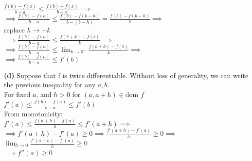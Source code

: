 \documentclass{article}
\begin{document}
\noindent $\frac{f(b) - f(a)}{b - a} \leq \frac{f(b) - f(x)}{b - x} \implies$ \\

\noindent $\implies \frac{f(b) - f(a)}{b - a} \leq \frac{f(b) - f(b - h)}{b - (b - h)} = \frac{f(b) - f(b - h)}{h} \implies$ \\
\noindent replace $h \to -k$ \\

\noindent $\implies \frac{f(b) - f(a)}{b - a} \leq \frac{f(b + k) - f(b)}{k} \implies$ \\

\noindent $\implies \frac{f(b) - f(a)}{b - a} \leq \lim_{k \to 0^-} \frac{f(b + k) - f(b)}{k} \implies$ \\

\noindent $\implies \frac{f(b) - f(a)}{b - a} \leq f'(b)$














\textbf{(d)} \noindent Suppose that f is twice differentiable. Without loss of generality, we can write the previous inequality for any $a, b$. \\

\noindent For fixed $a$, and $h>0$ for $(a, a+h) \in \text{dom } f$ \\

\noindent $f'(a) \leq \frac{f(b) - f(a)}{b - a} \leq f'(b)$ \\
From monotonicity: \\ 
\noindent $f'(a) \leq \frac{f(a+h) - f(a)}{h} \leq f'(a+h) \implies$ \\

\noindent $\implies f'(a+h) - f'(a) \geq 0 \implies \frac{f'(a+h) - f'(a)}{h} \geq 0 \implies$ $   \lim_{h \to 0} \frac{f'(a+h) - f'(a)}{h} \geq 0   $\\

\noindent $\implies f''(a) \geq 0$
\end{document}
